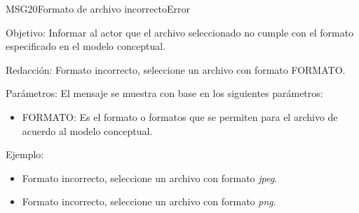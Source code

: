 \begin{mensaje}{MSG20}{Formato de archivo incorrecto}{Error}
	\item [Objetivo:] Informar al actor que el archivo seleccionado no cumple con el formato especificado en el modelo conceptual.
	\item[Redacción:] Formato incorrecto, seleccione un archivo con formato FORMATO.
	\item[Parámetros:] El mensaje se muestra con base en los siguientes parámetros:
	\begin{itemize}
		\item FORMATO: Es el formato o formatos que se permiten para el archivo de acuerdo al modelo conceptual.
	\end{itemize}
	\item[Ejemplo:] \begin{itemize}
		\item Formato incorrecto, seleccione un archivo con formato {\em jpeg}.
		\item Formato incorrecto, seleccione un archivo con formato {\em png}.
	\end{itemize}
\end{mensaje}